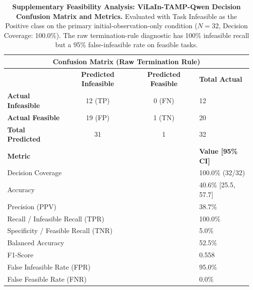 \begin{table}[t]
\centering
\small
\caption{\textbf{Supplementary Feasibility Analysis: ViLaIn-TAMP-Qwen Decision Confusion Matrix and Metrics.}
Evaluated with Task Infeasible as the Positive class on the primary initial-observation-only condition ($N=32$, Decision Coverage: 100.0\%).
The raw termination-rule diagnostic has 100\% infeasible recall but a 95\% false-infeasible rate on feasible tasks.}
\label{tab:vilain_qwen_feasibility}
\begin{tabular}{l|cc|l}
\hline
\multicolumn{4}{c}{\textbf{Confusion Matrix (Raw Termination Rule)}} \\
\hline
& \textbf{Predicted Infeasible} & \textbf{Predicted Feasible} & \textbf{Total Actual} \\
\hline
\textbf{Actual Infeasible} & 12 (TP) & 0 (FN) & 12 \\
\textbf{Actual Feasible}   & 19 (FP) & 1 (TN) & 20 \\
\hline
\textbf{Total Predicted}   & 31 & 1 & 32 \\
\hline
\hline
\multicolumn{3}{l|}{\textbf{Metric}} & \textbf{Value [95\% CI]} \\
\hline
\multicolumn{3}{l|}{Decision Coverage} & 100.0\% (32/32) \\
\multicolumn{3}{l|}{Accuracy} & 40.6\% [25.5, 57.7] \\
\multicolumn{3}{l|}{Precision (PPV)} & 38.7\% \\
\multicolumn{3}{l|}{Recall / Infeasible Recall (TPR)} & 100.0\% \\
\multicolumn{3}{l|}{Specificity / Feasible Recall (TNR)} & 5.0\% \\
\multicolumn{3}{l|}{Balanced Accuracy} & 52.5\% \\
\multicolumn{3}{l|}{F1-Score} & 0.558 \\
\multicolumn{3}{l|}{False Infeasible Rate (FPR)} & 95.0\% \\
\multicolumn{3}{l|}{False Feasible Rate (FNR)} & 0.0\% \\
\hline
\end{tabular}
\end{table}
